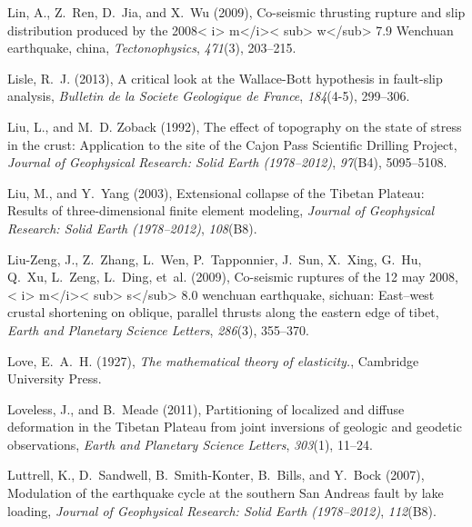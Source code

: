 \documentclass[twocolumn,jgrga]{AGUTeX}
\begin{document}
\begin{article}
{{\begin{thebibliography}{87}
Lin, A., Z.~Ren, D.~Jia, and X.~Wu (2009), Co-seismic thrusting rupture and
  slip distribution produced by the 2008< i> m</i>< sub> w</sub> 7.9 {W}enchuan
  earthquake, china, \textit{Tectonophysics}, \textit{471}(3), 203--215.

Lisle, R.~J. (2013), A critical look at the {W}allace-{B}ott hypothesis in
  fault-slip analysis, \textit{Bulletin de la Societe Geologique de France},
  \textit{184}(4-5), 299--306.

Liu, L., and M.~D. Zoback (1992), The effect of topography on the state of
  stress in the crust: {A}pplication to the site of the {C}ajon {P}ass
  {S}cientific {D}rilling {P}roject, \textit{Journal of Geophysical Research:
  Solid Earth (1978--2012)}, \textit{97}(B4), 5095--5108.

Liu, M., and Y.~Yang (2003), Extensional collapse of the {T}ibetan {P}lateau:
  {R}esults of three-dimensional finite element modeling, \textit{Journal of
  Geophysical Research: Solid Earth (1978--2012)}, \textit{108}(B8).

Liu-Zeng, J., Z.~Zhang, L.~Wen, P.~Tapponnier, J.~Sun, X.~Xing, G.~Hu, Q.~Xu,
  L.~Zeng, L.~Ding, et~al. (2009), Co-seismic ruptures of the 12 may 2008,< i>
  m</i>< sub> s</sub> 8.0 wenchuan earthquake, sichuan: East--west crustal
  shortening on oblique, parallel thrusts along the eastern edge of tibet,
  \textit{Earth and Planetary Science Letters}, \textit{286}(3), 355--370.

Love, E.~A.~H. (1927), \textit{The mathematical theory of elasticity.},
  Cambridge University Press.

Loveless, J., and B.~Meade (2011), Partitioning of localized and diffuse
  deformation in the {T}ibetan {P}lateau from joint inversions of geologic and
  geodetic observations, \textit{Earth and Planetary Science Letters},
  \textit{303}(1), 11--24.

Luttrell, K., D.~Sandwell, B.~Smith-Konter, B.~Bills, and Y.~Bock (2007),
  Modulation of the earthquake cycle at the southern {S}an {A}ndreas fault by
  lake loading, \textit{Journal of Geophysical Research: Solid Earth
  (1978--2012)}, \textit{112}(B8).


\end{thebibliography}}}
\end{article}
\end{document}
